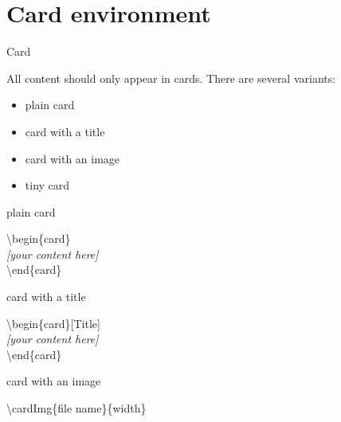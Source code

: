 \documentclass[aspectratio=43]{beamer}
\begin{document}
\section{Card environment}
\begin{frame}{Card}
\begin{card}
All content should only appear in cards. There are several variants:
\begin{itemize}
\item plain card
\item card with a title
\item card with an image
\item tiny card
\end{itemize}
\end{card}
\end{frame}

\begin{frame}{plain card}
\begin{card}
\end{card}

\begin{card}
{\color{primary} \textbackslash begin\{card\}\\[2mm]}
\null\qquad \textit{[your content here]}\\[2mm]
{\color{primary} \textbackslash end\{card\}}
\end{card}
\end{frame}

\begin{frame}{card with a title}
\begin{card}[Title]
\end{card}

\begin{card}
{\color{primary} \textbackslash begin\{card\}[Title]\\[2mm]}
\null\qquad \textit{[your content here]}\\[2mm]
{\color{primary} \textbackslash end\{card\}}
\end{card}
\end{frame}

\begin{frame}{card with an image}
\centering
{}

\begin{card}
{\color{primary} \textbackslash cardImg\{file name\}\{width\}}
\end{card}
\end{frame}
\end{document}
